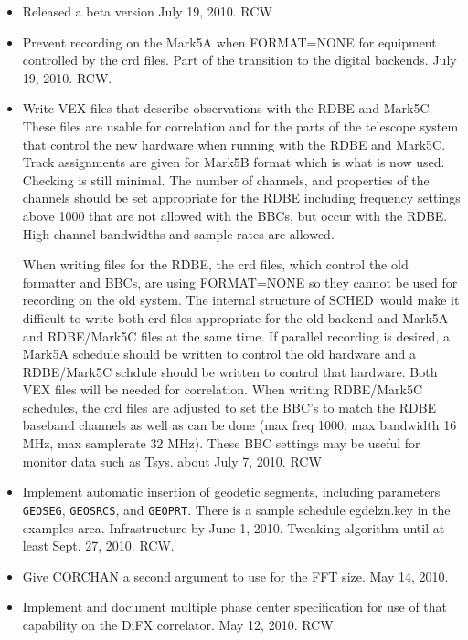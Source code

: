 \documentclass{report}
\newcommand{\schedb}{{\sc SCHED~}}
\begin{document}
\begin{itemize}
\item Released a beta version July 19, 2010.  RCW

\item Prevent recording on the Mark5A when FORMAT=NONE for equipment
controlled by the crd files.  Part of the transition to the digital
backends. July 19, 2010. RCW.

\item Write VEX files that describe observations with the RDBE and
Mark5C.  These files are usable for correlation and for the parts of
the telescope system that control the new hardware when running with
the RDBE and Mark5C.  Track assignments are given for Mark5B format
which is what is now used.  Checking is still minimal.  The number of
channels, and properties of the channels should be set appropriate for
the RDBE including frequency settings above 1000 that are not allowed
with the BBCs, but occur with the RDBE.  High channel bandwidths and
sample rates are allowed.

When writing files for the RDBE, the crd files, which control the old
formatter and BBCs, are using FORMAT=NONE so they cannot be used for
recording on the old system.  The internal structure of \schedb would
make it difficult to write both crd files appropriate for the old
backend and Mark5A and RDBE/Mark5C files at the same time.  If
parallel recording is desired, a Mark5A schedule should be written to
control the old hardware and a RDBE/Mark5C schdule should be written
to control that hardware.  Both VEX files will be needed for
correlation.  When writing RDBE/Mark5C schedules, the crd files are
adjusted to set the BBC's to match the RDBE baseband channels as well
as can be done (max freq 1000, max bandwidth 16 MHz, max samplerate 32
MHz).  These BBC settings may be useful for monitor data such as Tsys.
about July 7, 2010.  RCW

\item Implement automatic insertion of geodetic segments, including
parameters {\tt GEOSEG}, {\tt GEOSRCS}, and {\tt GEOPRT}.  There is a
sample schedule egdelzn.key in the examples area.  Infrastructure by
June 1, 2010.  Tweaking algorithm until at least Sept. 27, 2010. RCW.

\item Give CORCHAN a second argument to use for the FFT size.
May 14, 2010.

\item Implement and document multiple phase center specification
for use of that capability on the DiFX correlator.  May 12, 2010. RCW.


\end{itemize}
\end{document}
